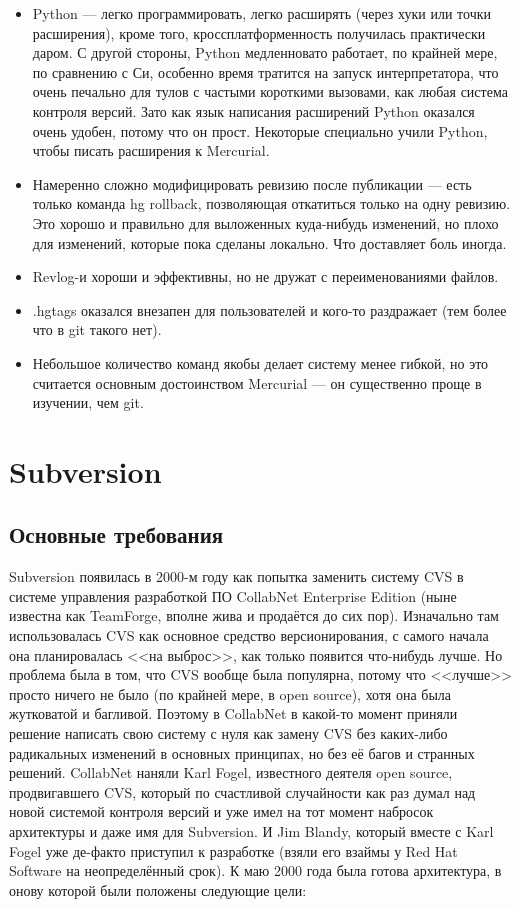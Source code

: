 \documentclass{../../text-style}
\begin{document}
\begin{itemize}
    \item Python --- легко программировать, легко расширять (через хуки или точки расширения), кроме того, кроссплатформенность получилась практически даром. С другой стороны, Python медленновато работает, по крайней мере, по сравнению с Си, особенно время тратится на запуск интерпретатора, что очень печально для тулов с частыми короткими вызовами, как любая система контроля версий. Зато как язык написания расширений Python оказался очень удобен, потому что он прост. Некоторые специально учили Python, чтобы писать расширения к Mercurial.
    \item Намеренно сложно модифицировать ревизию после публикации --- есть только команда hg rollback, позволяющая откатиться только на одну ревизию. Это хорошо и правильно для выложенных куда-нибудь изменений, но плохо для изменений, которые пока сделаны локально. Что доставляет боль иногда.
    \item Revlog-и хороши и эффективны, но не дружат с переименованиями файлов.
    \item .hgtags оказался внезапен для пользователей и кого-то раздражает (тем более что в git такого нет).
    \item Небольшое количество команд якобы делает систему менее гибкой, но это считается основным достоинством Mercurial --- он существенно проще в изучении, чем git.
\end{itemize}

\section{Subversion}

\subsection{Основные требования}

Subversion появилась в 2000-м году как попытка заменить систему CVS в системе управления разработкой ПО CollabNet Enterprise Edition (ныне известна как TeamForge, вполне жива и продаётся до сих пор). Изначально там использовалась CVS как основное средство версионирования, с самого начала она планировалась <<на выброс>>, как только появится что-нибудь лучше. Но проблема была в том, что CVS вообще была популярна, потому что <<лучше>> просто ничего не было (по крайней мере, в open source), хотя она была жутковатой и багливой. Поэтому в CollabNet в какой-то момент приняли решение написать свою систему с нуля как замену CVS без каких-либо радикальных изменений в основных принципах, но без её багов и странных решений. CollabNet наняли Karl Fogel, известного деятеля open source, продвигавшего CVS, который по счастливой случайности как раз думал над новой системой контроля версий и уже имел на тот момент набросок архитектуры и даже имя для Subversion. И Jim Blandy, который вместе с Karl Fogel уже де-факто приступил к разработке (взяли его взаймы у Red Hat Software на неопределённый срок). К маю 2000 года была готова архитектура, в онову которой были положены следующие цели:
\end{document}
